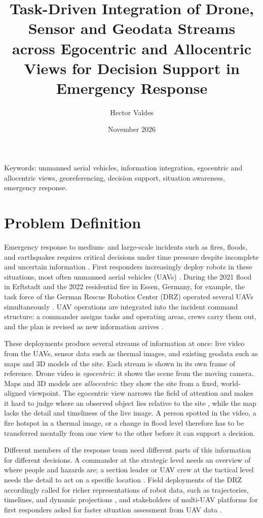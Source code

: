 \documentclass{article}
\title{Task-Driven Integration of Drone, Sensor and Geodata Streams across Egocentric and Allocentric Views for Decision Support in Emergency Response}
\author{Hector Valdes}
\date{November 2026}
\begin{document}
\maketitle

Keywords:
unmanned aerial vehicles, information integration, egocentric and allocentric views, georeferencing, decision support, situation awareness, emergency response.

\section{Problem Definition}
Emergency response to medium- and large-scale incidents such as fires, floods, and earthquakes requires critical decisions under time pressure despite incomplete and uncertain information \cite{kruijff2021}.
First responders increasingly deploy robots in these situations, most often unmanned aerial vehicles (UAVs) \cite{kruijff2021, delmerico2019}.
During the 2021 flood in Erftstadt and the 2022 residential fire in Essen, Germany, for example, the task force of the German Rescue Robotics Center (DRZ) operated several UAVs simultaneously \cite{surmann2024}.
UAV operations are integrated into the incident command structure: a commander assigns tasks and operating areas, crews carry them out, and the plan is revised as new information arrives \cite{murphy2014disaster, kruijff2021}.

These deployments produce several streams of information at once: live video from the UAVs, sensor data such as thermal images, and existing geodata such as maps and 3D models of the site.
Each stream is shown in its own frame of reference.
Drone video is \emph{egocentric}: it shows the scene from the moving camera.
Maps and 3D models are \emph{allocentric}: they show the site from a fixed, world-aligned viewpoint.
The egocentric view narrows the field of attention and makes it hard to judge where an observed object lies relative to the site \cite{thomas2001, hollands2011}, while the map lacks the detail and timeliness of the live image.
A person spotted in the video, a fire hotspot in a thermal image, or a change in flood level therefore has to be transferred mentally from one view to the other before it can support a decision.

Different members of the response team need different parts of this information for different decisions.
A commander at the strategic level needs an overview of where people and hazards are; a section leader or UAV crew at the tactical level needs the detail to act on a specific location \cite{murphy2014disaster, kruijff2021}.
Field deployments of the DRZ accordingly called for richer representations of robot data, such as trajectories, timelines, and dynamic projections \cite{surmann2024}, and stakeholders of multi-UAV platforms for first responders asked for faster situation assessment from UAV data \cite{friedrich2020respondrone}.
\end{document}
